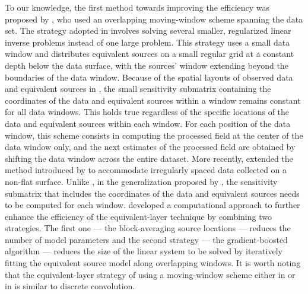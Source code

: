 \documentclass[utf8]{FrontiersinHarvard} %
\begin{document}
	
	To our knowledge, the first method towards improving the efficiency  was proposed by \cite{leao-silva1989}, 
	who used an overlapping moving-window scheme spanning the data set. 
	The strategy adopted in \cite{leao-silva1989} involves solving several smaller, regularized linear 
	inverse problems instead of one large problem. 
	This strategy uses a small data window and distributes equivalent sources 
	on a small regular grid at a constant depth below the data surface, with the sources' window extending beyond 
	the boundaries of the data window.
	Because of the spatial layouts of observed data and equivalent sources in \cite{leao-silva1989}, the small 
	sensitivity submatrix containing the coordinates of the data and equivalent sources within a window remains 
	constant for all data windows. This holds true regardless  of the specific locations of the data and equivalent 
	sources within each window.
	For each position of the data window, this scheme consists in computing the processed field 
	at the center of the data window only, and the next estimates of the processed field are 
	obtained by shifting the data window across the entire dataset. 
	More recently, \cite{soler-uieda2021} extended the method introduced by \cite{leao-silva1989} to accommodate 
	irregularly spaced data collected on a non-flat surface.
	Unlike  \cite{leao-silva1989}, in the generalization proposed by \cite{soler-uieda2021}, the sensitivity 
	submatrix that includes the coordinates of the data and equivalent sources needs to be computed for each window.
	\cite{soler-uieda2021}  developed a computational approach to further enhance the efficiency of the 
	equivalent-layer technique by combining two strategies. 
	The first one --- the block-averaging source locations --- reduces the number of model parameters and the second 
	strategy --- the gradient-boosted algorithm --- reduces the size of the linear system to be solved by 
	iteratively fitting the equivalent source model along overlapping windows. 
	It is worth noting that the equivalent-layer strategy of using a moving-window scheme either in 
	\cite{leao-silva1989} or in \cite{soler-uieda2021} is similar to discrete convolution.
	
\end{document}
